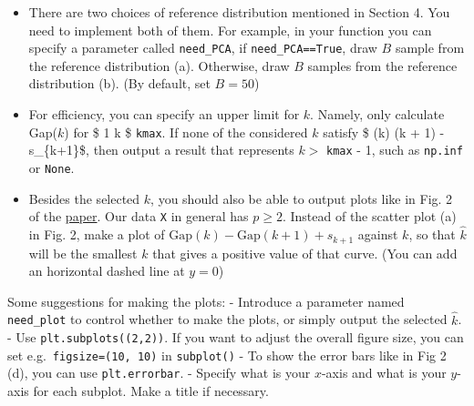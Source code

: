 \documentclass[11pt]{article}
\begin{document}
\begin{itemize}
\item
  There are two choices of reference distribution mentioned in Section
  4. You need to implement both of them. For example, in your function
  you can specify a parameter called \texttt{need\_PCA}, if
  \texttt{need\_PCA==True}, draw \(B\) sample from the reference
  distribution (a). Otherwise, draw \(B\) samples from the reference
  distribution (b). (By default, set \(B = 50\))
\item
  For efficiency, you can specify an upper limit for \(k\). Namely, only
  calculate Gap(\(k\)) for \$ 1 \le k \le\$ \texttt{kmax}. If none of
  the considered \(k\) satisfy \$ (k) \ge {}(k +
  1) - s\_\{k+1\}\$, then output a result that represents \(k>\)
  \texttt{kmax} - 1, such as \texttt{np.inf} or \texttt{None}.
\item
  Besides the selected \(k\), you should also be able to output plots
  like in Fig. 2 of the \href{hastie.su.domains/Papers/gap.pdf}{paper}.
  Our data \texttt{X} in general has \(p \ge 2\). Instead of the scatter
  plot (a) in Fig. 2, make a plot of
  \(\textrm{Gap}(k) - \textrm{Gap}(k + 1) + s_{k+1}\) against \(k\), so
  that \(\hat{k}\) will be the smallest \(k\) that gives a positive
  value of that curve. (You can add an horizontal dashed line at
  \(y=0\))
\end{itemize}

Some suggestions for making the plots: - Introduce a parameter named
\texttt{need\_plot} to control whether to make the plots, or simply
output the selected \(\hat{k}\). - Use \texttt{plt.subplots((2,2))}. If
you want to adjust the overall figure size, you can set
e.g.~\texttt{figsize=(10,\ 10)} in \texttt{subplot()} - To show the
error bars like in Fig 2 (d), you can use \texttt{plt.errorbar}. -
Specify what is your \(x\)-axis and what is your \(y\)-axis for each
subplot. Make a title if necessary.
\end{document}
